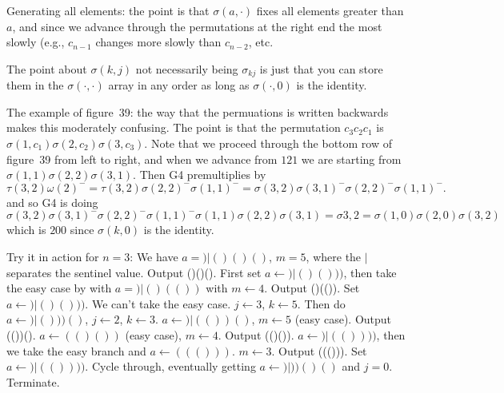  Generating all elements: the point is that 
$\sigma\left(a, \cdot\right)$ fixes all elements greater than $a$,
and since we advance through the permutations at the right end
the most slowly (e.g., $c_{n-1}$ changes more slowly than $c_{n-2}$,
etc.


\noindent [p 328] The point about $\sigma\left(k, j\right)$ not
necessarily being $\sigma_{kj}$ is just that you can store them in
the $\sigma\left(\cdot, \cdot\right)$ array in any order as long
as $\sigma\left(\cdot, 0\right)$ is the identity.

 The example of figure~39: the way that the
permuations is written backwards makes this moderately confusing.
The point is that the permutation $c_3 c_2 c_1$ is
$\sigma\left(1, c_1\right) \sigma\left(2, c_2\right) \sigma\left(3, c_3\right)$.
Note that we proceed through the bottom row of figure~39 from left
to right, and when we advance from $121$ we are starting from
$\sigma\left(1, 1\right) \sigma\left(2, 2\right) \sigma\left(3, 1\right)$.
Then G4 premultiplies by 
$$
 \tau\left(3, 2\right) \omega\left(2\right)^{-} = 
  \tau\left(3, 2\right) \sigma\left(2, 2\right)^{-} \sigma\left(1, 1\right)^{-} =
  \sigma\left(3, 2\right) \sigma\left(3, 1\right)^{-} \sigma\left(2, 2\right)^{-} 
  \sigma\left(1, 1\right)^{-} .
$$
and so G4 is doing 
$$
\sigma\left(3, 2\right) \sigma\left(3, 1\right)^{-} \sigma\left(2, 2\right)^{-} 
  \sigma\left(1, 1\right)^{-} \sigma\left(1, 1\right) \sigma\left(2, 2\right) \sigma\left(3, 1\right)
  = \sigma{3, 2} = \sigma\left(1, 0\right) \sigma\left(2, 0\right) \sigma\left(3, 2\right)
$$
which is $200$ since $\sigma\left(k, 0\right)$ is the identity.
 


 \hfil\break
Try it in action for $n=3$:
 We have $a = ) \vert ()()()$, $m = 5$, where the $\vert$
separates the sentinel value.
 Output ()()().
 First set $a \gets ) \vert ()()))$, then take the easy
case by with $a = ) \vert ()(())$ with $m \gets 4$.
 Output ()(()).
 Set $a \gets ) \vert ()()))$.  We can't take the easy case.
 $j \gets 3$, $k \gets 5$.  Then do $a \gets ) \vert ()))()$,
$j \gets 2$, $k \gets 3$.
 $a \gets ) \vert (())()$, $m \gets 5$ (easy case).
 Output (())().
 $a \gets (()())$ (easy case), $m \gets 4$.
 Output (()()).
 $a \gets ) \vert (())))$, then we take the easy branch and
 $a \gets ((()))$. $m \gets 3$.
 Output ((())).
 Set $a \gets ) \vert (())))$.
 Cycle through, eventually getting $a \gets ) \vert ))()()$ and
 $j = 0$.
 Terminate.

